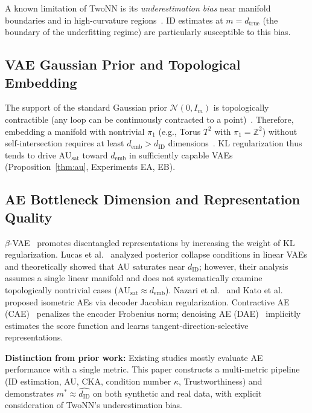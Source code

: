 \documentclass[lettersize,journal]{IEEEtran}
\newcommand{\dID}{d_{\mathrm{ID}}}
\newcommand{\dtrue}{d_{\mathrm{true}}}
\newcommand{\kap}{\kappa}
\newcommand{\AUsat}{\mathrm{AU}_{\mathrm{sat}}}
\newcommand{\demb}{d_{\mathrm{emb}}}
\begin{document}
A known limitation of TwoNN is its \emph{underestimation bias} near manifold boundaries and in high-curvature regions~\cite{facco2017twonn}.
ID estimates at $m = \dtrue$ (the boundary of the underfitting regime) are particularly susceptible to this bias.

\subsection{VAE Gaussian Prior and Topological Embedding}

The support of the standard Gaussian prior $\mathcal{N}(0, I_m)$ is topologically contractible (any loop can be continuously contracted to a point)~\cite{hatcher2002algebraic}.
Therefore, embedding a manifold with nontrivial $\pi_1$ (e.g., Torus $T^2$ with $\pi_1 = \mathbb{Z}^2$) without self-intersection requires at least $\demb > \dID$ dimensions~\cite{hatcher2002algebraic,guillemin1974differential}.
KL regularization thus tends to drive $\AUsat$ toward $\demb$ in sufficiently capable VAEs (Proposition~\ref{thm:au}, Experiments EA, EB).

\subsection{AE Bottleneck Dimension and Representation Quality}

$\beta$-VAE~\cite{higgins2017betavae} promotes disentangled representations by increasing the weight of KL regularization.
Lucas et al.~\cite{lucas2019elbo} analyzed posterior collapse conditions in linear VAEs and theoretically showed that AU saturates near $d_\mathrm{ID}$; however, their analysis assumes a single linear manifold and does not systematically examine topologically nontrivial cases ($\AUsat \approx \demb$).
Nazari et al.~\cite{nazari2023geometric} and Kato et al.~\cite{kato2020rdae} proposed isometric AEs via decoder Jacobian regularization.
Contractive AE (CAE)~\cite{rifai2011cae} penalizes the encoder Frobenius norm; denoising AE (DAE)~\cite{alain2014dae} implicitly estimates the score function and learns tangent-direction-selective representations.

\textbf{Distinction from prior work:}
Existing studies mostly evaluate AE performance with a single metric.
This paper constructs a multi-metric pipeline (ID estimation, AU, CKA, condition number $\kap$, Trustworthiness) and demonstrates $m^* \approx \hat{\dID}$ on both synthetic and real data, with explicit consideration of TwoNN's underestimation bias.
\end{document}
